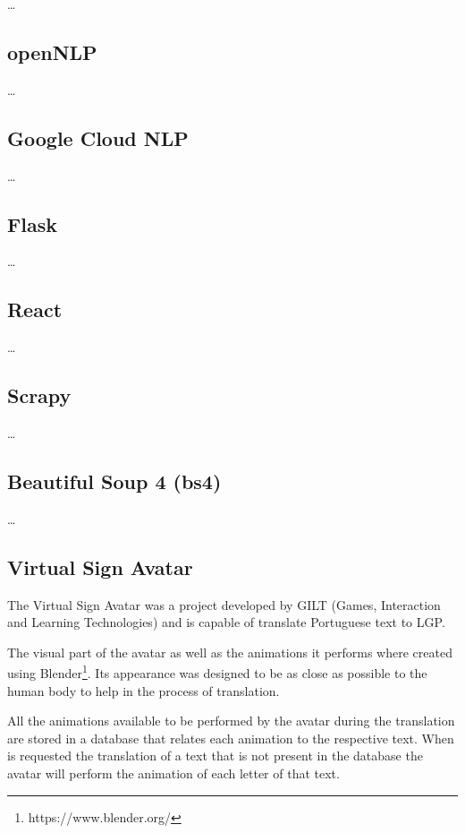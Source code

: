 \dots

\subsection{openNLP}

\dots

\subsection{Google Cloud NLP}

\dots

\subsection{Flask}

\dots

\subsection{React}

\dots

\subsection{Scrapy}

\dots

\subsection{Beautiful Soup 4 (bs4)}

\dots

\subsection{Virtual Sign Avatar}

The Virtual Sign Avatar\cite{escudeiro2015virtual} was a project developed by GILT (Games, Interaction and Learning Technologies) and is capable of translate Portuguese text to \gls{LGP}.

The visual part of the avatar as well as the animations it performs where created using Blender\footnote{https://www.blender.org/}.
Its appearance was designed to be as close as possible to the human body to help in the process of translation.

All the animations available to be performed by the avatar during the translation are stored in a database that relates each animation to the respective text.
When is requested the translation of a text that is not present in the database the avatar will perform the animation of each letter of that text.

